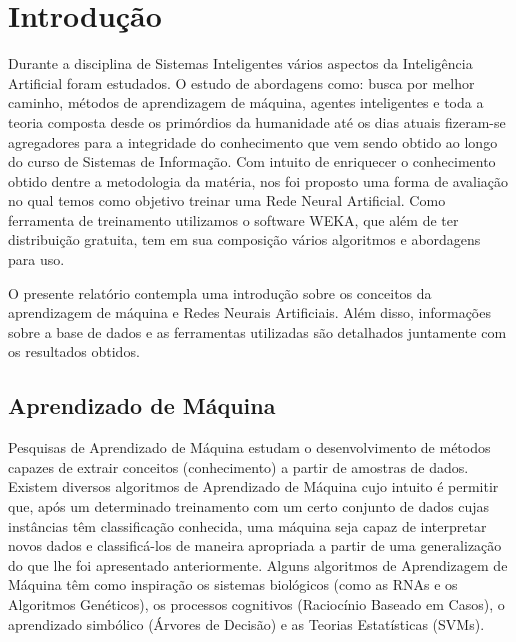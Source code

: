 \documentclass[
	article,			%
	11pt,				%
	oneside,			%
	a4paper,			%
	english,			%
	brazil,				%
	sumario=tradicional
	]{abntex2}
\begin{document}
\frenchspacing 



\maketitle
\tableofcontents
\newpage 



\textual


\section{Introdução}

Durante a disciplina de Sistemas Inteligentes vários aspectos da Inteligência Artificial foram estudados. O estudo de abordagens como: busca por melhor caminho, métodos de aprendizagem de máquina, agentes inteligentes e toda a teoria composta desde os primórdios da humanidade até os dias atuais fizeram-se agregadores para a integridade do conhecimento que vem sendo obtido ao longo do curso de Sistemas de Informação. Com intuito de enriquecer o conhecimento obtido dentre a metodologia da matéria, nos foi proposto uma forma de avaliação no qual temos como objetivo treinar uma Rede Neural Artificial. Como ferramenta de treinamento utilizamos o software WEKA, que além de ter distribuição gratuita, tem em sua composição vários algoritmos e abordagens para uso.

O presente relatório contempla uma introdução sobre os conceitos da aprendizagem de máquina e Redes Neurais Artificiais. Além disso, informações sobre a base de dados e as ferramentas utilizadas são detalhados juntamente com os resultados obtidos.

\subsection{Aprendizado de Máquina}

Pesquisas de Aprendizado de Máquina estudam o desenvolvimento de métodos capazes de extrair conceitos (conhecimento) a partir de amostras de dados. Existem diversos algoritmos de Aprendizado de Máquina cujo intuito é permitir que, após um determinado treinamento com um certo conjunto de dados cujas instâncias têm classificação conhecida, uma máquina seja capaz de interpretar novos dados e classificá-los de maneira apropriada a partir de uma generalização do que lhe foi apresentado anteriormente. Alguns algoritmos de Aprendizagem de Máquina têm como inspiração os sistemas biológicos (como as RNAs e os Algoritmos Genéticos), os processos cognitivos (Raciocínio Baseado em Casos), o aprendizado simbólico (Árvores de Decisão) e as Teorias Estatísticas (SVMs).
\end{document}
